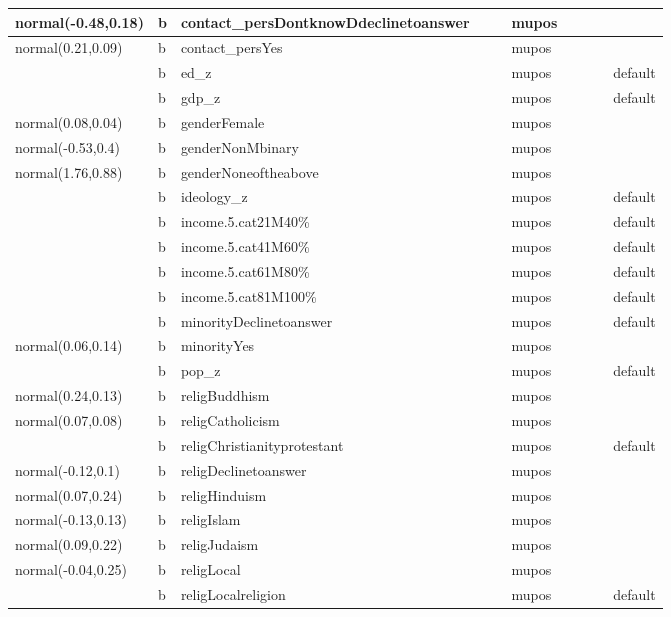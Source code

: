 \documentclass[
]{book}
\theoremstyle{definition}
\theoremstyle{definition}
\theoremstyle{definition}
\theoremstyle{definition}
\theoremstyle{remark}
\begin{document}
\begin{table}
\begin{tabular}[t]{l|l|l|l|l|l|l|l|l|l}
\hline
normal(-0.48,0.18) & b & contact\_persDontknowDdeclinetoanswer &  &  & mupos &  &  &  & \\
\hline
normal(0.21,0.09) & b & contact\_persYes &  &  & mupos &  &  &  & \\
\hline
 & b & ed\_z &  &  & mupos &  &  &  & default\\
\hline
 & b & gdp\_z &  &  & mupos &  &  &  & default\\
\hline
normal(0.08,0.04) & b & genderFemale &  &  & mupos &  &  &  & \\
\hline
normal(-0.53,0.4) & b & genderNonMbinary &  &  & mupos &  &  &  & \\
\hline
normal(1.76,0.88) & b & genderNoneoftheabove &  &  & mupos &  &  &  & \\
\hline
 & b & ideology\_z &  &  & mupos &  &  &  & default\\
\hline
 & b & income.5.cat21M40\% &  &  & mupos &  &  &  & default\\
\hline
 & b & income.5.cat41M60\% &  &  & mupos &  &  &  & default\\
\hline
 & b & income.5.cat61M80\% &  &  & mupos &  &  &  & default\\
\hline
 & b & income.5.cat81M100\% &  &  & mupos &  &  &  & default\\
\hline
 & b & minorityDeclinetoanswer &  &  & mupos &  &  &  & default\\
\hline
normal(0.06,0.14) & b & minorityYes &  &  & mupos &  &  &  & \\
\hline
 & b & pop\_z &  &  & mupos &  &  &  & default\\
\hline
normal(0.24,0.13) & b & religBuddhism &  &  & mupos &  &  &  & \\
\hline
normal(0.07,0.08) & b & religCatholicism &  &  & mupos &  &  &  & \\
\hline
 & b & religChristianityprotestant &  &  & mupos &  &  &  & default\\
\hline
normal(-0.12,0.1) & b & religDeclinetoanswer &  &  & mupos &  &  &  & \\
\hline
normal(0.07,0.24) & b & religHinduism &  &  & mupos &  &  &  & \\
\hline
normal(-0.13,0.13) & b & religIslam &  &  & mupos &  &  &  & \\
\hline
normal(0.09,0.22) & b & religJudaism &  &  & mupos &  &  &  & \\
\hline
normal(-0.04,0.25) & b & religLocal &  &  & mupos &  &  &  & \\
\hline
 & b & religLocalreligion &  &  & mupos &  &  &  & default\\

\end{tabular}
\end{table}
\end{document}

